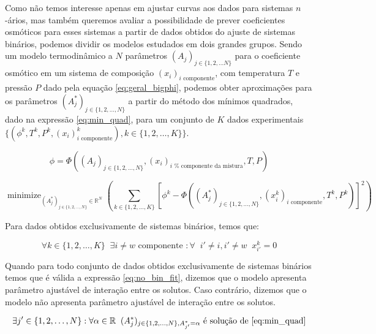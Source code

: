 \documentclass[
	12pt,				%
	openright,
	twoside,
	a4paper,			%
	english,			%
	french,				%
	spanish,			%
	brazil				%
	]{abntex2}
\DeclareMathOperator*{\minimize}{minimize}
\begin{document}
Como não temos interesse apenas em ajustar curvas aos dados para sistemas
$n$-ários, mas também queremos avaliar a possibilidade de prever coeficientes
osmóticos para esses sistemas a partir de dados obtidos do ajuste de sistemas
binários, podemos dividir os modelos estudados em dois grandes grupos. Sendo um
modelo termodinâmico a $N$ parâmetros $(A_j)_{j \in \{1, 2, \ldots N\}}$ para o
coeficiente osmótico em um sistema de composição $(x_i)_\text{$i$ componente}$,
com temperatura $T$ e pressão $P$ dado pela equação \ref{eq:geral_bigphi},
podemos obter aproximações para os parâmetros $(A_j^*)_{j \in \{1, 2, \ldots, N\}}$
a partir do método dos mínimos quadrados, dado na expressão \ref{eq:min_quad},
para um conjunto de $K$ dados experimentais $\{(\phi^k, T^k, P^k,%
	(x_i)^k_\text{$i$ componente}), k \in \{1,2,\ldots,K\}\}$.

\begin{equation}
	\label{eq:geral_bigphi}
	\phi = \Phi((A_j)_{j \in \{1, 2, \ldots, N\}}, (x_i)_\text{$i$ %
		componente da mistura}, T, P)
\end{equation}

\begin{equation}
	\label{eq:min_quad}
	\minimize_{(A_j^*)_{j \in \{1,2,\ldots,N\}} \in \mathbb{R}^N}%
	\left(\sum_{k \in \{1,2,\ldots,K\}}\left[\phi^k - \Phi((A^*_j)_{j%
	\in \{1, 2, \ldots, N\}}, (x^k_i)_\text{$i$ componente},%
	T^k, P^k)\right]^2\right)
\end{equation}

Para dados obtidos exclusivamente de sistemas binários, temos que:

\begin{equation}
	\forall k \in \{1,2,\ldots,K\} \;\; \exists i \neq w%
	\text{ componente } : \forall \;\; i' \neq i, i' \neq w\;\; x^k_{i'} = 0
\end{equation}

Quando para todo conjunto de dados obtidos exclusivamente de sistemas binários
temos que é válida a expressão \ref{eq:no_bin_fit},
dizemos que o modelo apresenta parâmetro ajustável de interação entre os
solutos. Caso contrário, dizemos que o modelo não apresenta parâmetro
ajustável de interação entre os solutos.

\begin{equation}
	\label{eq:no_bin_fit}
	\exists j' \in \{1,2,\ldots,N\} : \forall \alpha \in \mathbb{R}\;\;%
	(A_j^*)_{j \in \{1,2,\ldots,N\}, A_{j'}^* = \alpha}%
	\text{ é solução de \ref{eq:min_quad}}
\end{equation}
\end{document}

